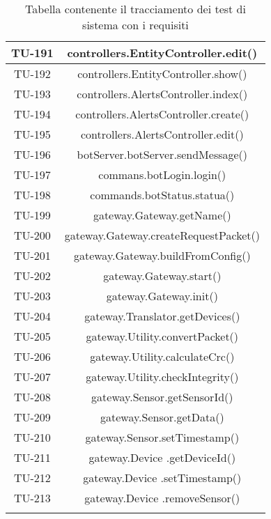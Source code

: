 \begin{center}
\begin{longtable}{|c|c|}
			\hline
			TU-191 & controllers.EntityController.edit() \\
			\hline
			TU-192 & controllers.EntityController.show() \\
			\hline
			TU-193 & controllers.AlertsController.index() \\
			\hline
			TU-194 & controllers.AlertsController.create() \\
			\hline
			TU-195 & controllers.AlertsController.edit() \\
			\hline
			TU-196 & botServer.botServer.sendMessage() \\
			\hline
			TU-197 & commans.botLogin.login() \\
			\hline
			TU-198 & commands.botStatus.statua() \\
			\hline
			TU-199 & gateway.Gateway.getName() \\
			\hline
			TU-200 & gateway.Gateway.createRequestPacket() \\
			\hline
			TU-201 & gateway.Gateway.buildFromConfig() \\
			\hline
			TU-202 & gateway.Gateway.start() \\
			\hline
			TU-203 & gateway.Gateway.init() \\
			\hline
			TU-204 & gateway.Translator.getDevices() \\
			\hline
			TU-205 & gateway.Utility.convertPacket() \\
			\hline
			TU-206 & gateway.Utility.calculateCrc() \\
			\hline
			TU-207 & gateway.Utility.checkIntegrity() \\
			\hline
			TU-208 & gateway.Sensor.getSensorId() \\
			\hline
			TU-209 & gateway.Sensor.getData() \\
			\hline
			TU-210 & gateway.Sensor.setTimestamp() \\
			\hline
			TU-211 & gateway.Device .getDeviceId() \\
			\hline
			TU-212 & gateway.Device .setTimestamp() \\
			\hline
			TU-213 & gateway.Device .removeSensor() \\
			\hline

			\caption{Tabella contenente il tracciamento dei test di sistema con i requisiti}
			\end{longtable}
		\end{center}
